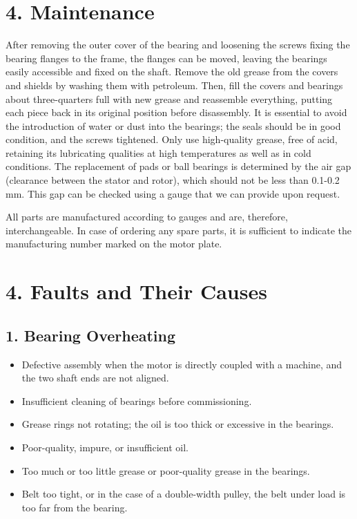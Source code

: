 \section*{4. Maintenance}

After removing the outer cover of the bearing and loosening the screws fixing the bearing flanges to the frame,
the flanges can be moved, leaving the bearings easily accessible and fixed on the shaft.
Remove the old grease from the covers and shields by washing them with petroleum.
Then, fill the covers and bearings about three-quarters full with new grease and reassemble everything,
putting each piece back in its original position before disassembly.
It is essential to avoid the introduction of water or dust into the bearings; the seals should be in good condition,
and the screws tightened. Only use high-quality grease, free of acid, retaining its lubricating qualities at high temperatures
as well as in cold conditions.
The replacement of pads or ball bearings is determined by the air gap (clearance between the stator and rotor),
which should not be less than 0.1-0.2 mm. This gap can be checked using a gauge that we can provide upon request.

All parts are manufactured according to gauges and are, therefore, interchangeable.
In case of ordering any spare parts, it is sufficient to indicate the manufacturing number marked on the motor plate.

\section*{4. Faults and Their Causes}

\subsection*{1. Bearing Overheating}
\begin{itemize}
    \item Defective assembly when the motor is directly coupled with a machine, and the two shaft ends are not aligned.
    \item Insufficient cleaning of bearings before commissioning.
    \item Grease rings not rotating; the oil is too thick or excessive in the bearings.
    \item Poor-quality, impure, or insufficient oil.
    \item Too much or too little grease or poor-quality grease in the bearings.
    \item Belt too tight, or in the case of a double-width pulley, the belt under load is too far from the bearing.
\end{itemize}

